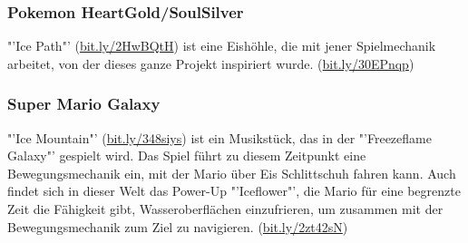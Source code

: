 \documentclass[a4paper,10pt,ngerman]{scrartcl}
\begin{document}
			
			\subsubsection{Pokemon HeartGold/SoulSilver}
			
				"'Ice Path"' (\href{https://youtube.com/watch?v=riClBdyycM4}{bit.ly/2HwBQtH}) ist eine Eishöhle, die mit jener Spielmechanik arbeitet, von der dieses ganze Projekt inspiriert wurde. (\href{https://youtube.com/watch?v=erqrS-e-piA}{bit.ly/30EPnqp})
	
	
			\subsubsection{Super Mario Galaxy}
			
			"'Ice Mountain"' (\href{https://youtube.com/watch?v=9qnJWbEnKOs}{bit.ly/348siys}) ist ein Musikstück, das in der "'Freezeflame Galaxy"' gespielt wird. Das Spiel führt zu diesem Zeitpunkt eine Bewegungsmechanik ein, mit der Mario über Eis Schlittschuh fahren kann. Auch findet sich in dieser Welt das Power-Up "'Iceflower"', die Mario für eine begrenzte Zeit die Fähigkeit gibt, Wasseroberflächen einzufrieren, um zusammen mit der Bewegungsmechanik zum Ziel zu navigieren. (\href{https://youtube.com/watch?v=ImsaYCFMJns}{bit.ly/2zt42sN})
		
\end{document}
